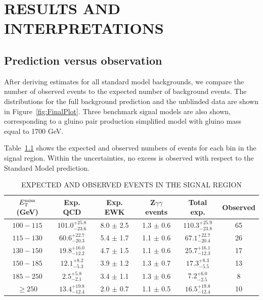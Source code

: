 \chapter{RESULTS AND INTERPRETATIONS}
\label{chap:Results}


\section{Prediction versus observation}
\label{sec:fullCount}
After deriving estimates for all standard model backgrounds, we compare the number of 
observed events to the expected number of background events. 
The \ETmiss distributions for the full background prediction and the unblinded data are
shown in Figure~\ref{fig:FinalPlot}. Three benchmark signal models are also shown, 
corresponding to a gluino pair production simplified model 
 with gluino mass equal to 1700 GeV.

Table~\ref{tab:ExpObs} shows the expected and observed numbers of events for each bin in the signal region.
Within the uncertainties, no excess is observed with respect to the Standard Model prediction.


\begin{table}[ht]
    \caption{EXPECTED AND OBSERVED EVENTS IN THE SIGNAL REGION}
    \centering
    \begin{tabular}{ |c|c|c|c|c|c|}
        \hline
        $E_{\mathrm{T}}^{\text{miss}}$ (GeV) & Exp. QCD & Exp. EWK &  Z$\gamma\gamma$ events  &Total exp. & Observed \\ [0.5ex]
        \hline
        $100 - 115$ & ${101.0}^{+25.8}_{-23.6}$ & 8.0 $\pm$ 2.5  & 1.3 $\pm$ 0.6 & ${ 110.3 }^{+25.9 }_{- 23.8 }$ & 65  \\
        $115 - 130$ & ${60.6}^{+ 22.7}_{-20.3}$ & 5.4 $\pm$ 1.7 & 1.1 $\pm$ 0.6 & ${ 67.1 }^{+22.7 }_{- 20.4 }$ & 26 \\
        $130 - 150$ & ${19.8}^{+ 16.0}_{-12.2}$ & 4.7 $\pm$ 1.5 & 1.1 $\pm$ 0.6 & ${ 25.7 }^{+16.1 }_{- 12.3 }$ & 17 \\
        $150 - 185$ & ${12.1}^{+ 8.2}_{-5.3}$  & 3.9 $\pm$ 1.2 & 1.3 $\pm$ 0.7 & ${ 17.3 }^{+8.3 }_{- 5.5 }$ & 13 \\
        $185 -  250$& ${2.5}^{+ 5.8}_{-2.1}$ & 3.4 $\pm$ 1.1 & 1.3 $\pm$ 0.6 & ${ 7.2 }^{+6.0 }_{- 2.5 }$ & 8  \\
        $\geq 250$  & ${13.4}^{+ 19.8}_{-12.4}$ & 2.0 $\pm$ 0.7 & 1.1 $\pm$ 0.5 & ${ 16.5 }^{+19.8 }_{- 12.4 }$ & 10 \\
        \hline
    \end{tabular}
    \label{tab:ExpObs}
\end{table}

